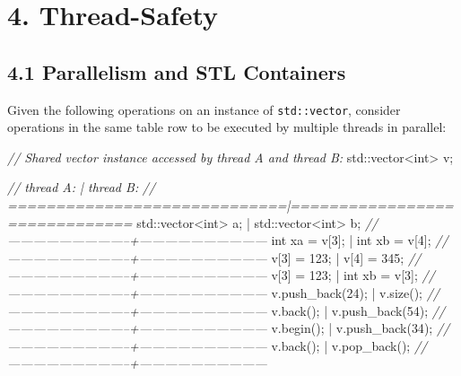 \documentclass[]{article}
\newenvironment{Shaded}{}{}
\newcommand{\DataTypeTok}[1]{\textcolor[rgb]{0.56,0.13,0.00}{{#1}}}
\newcommand{\DecValTok}[1]{\textcolor[rgb]{0.25,0.63,0.44}{{#1}}}
\newcommand{\CommentTok}[1]{\textcolor[rgb]{0.38,0.63,0.69}{\textit{{#1}}}}
\newcommand{\NormalTok}[1]{{#1}}
\begin{document}
\section{4. Thread-Safety}\label{thread-safety}

\subsection{4.1 Parallelism and STL
Containers}\label{parallelism-and-stl-containers}

Given the following operations on an instance of \texttt{std::vector},
consider operations in the same table row to be executed by multiple
threads in parallel:

\begin{Shaded}
\begin{Highlighting}[]
\CommentTok{// Shared vector instance accessed by thread A and thread B:}
\NormalTok{std::vector<}\DataTypeTok{int}\NormalTok{> v;}

\CommentTok{// thread A:                    | thread B:}
\CommentTok{// =============================|==============================}
   \NormalTok{std::vector<}\DataTypeTok{int}\NormalTok{> a;          | std::vector<}\DataTypeTok{int}\NormalTok{> b;}
\CommentTok{// -----------------------------+------------------------------}
   \DataTypeTok{int} \NormalTok{xa = v[}\DecValTok{3}\NormalTok{];               | }\DataTypeTok{int} \NormalTok{xb = v[}\DecValTok{4}\NormalTok{];}
\CommentTok{// -----------------------------+------------------------------}
   \NormalTok{v[}\DecValTok{3}\NormalTok{] = }\DecValTok{123}\NormalTok{;                  | v[}\DecValTok{4}\NormalTok{] = }\DecValTok{345}\NormalTok{;}
\CommentTok{// -----------------------------+------------------------------}
   \NormalTok{v[}\DecValTok{3}\NormalTok{] = }\DecValTok{123}\NormalTok{;                  | }\DataTypeTok{int} \NormalTok{xb = v[}\DecValTok{3}\NormalTok{];}
\CommentTok{// -----------------------------+------------------------------}
   \NormalTok{v.push_back(}\DecValTok{24}\NormalTok{);             | v.size();}
\CommentTok{// -----------------------------+------------------------------}
   \NormalTok{v.back();                    | v.push_back(}\DecValTok{54}\NormalTok{);}
\CommentTok{// -----------------------------+------------------------------}
   \NormalTok{v.begin();                   | v.push_back(}\DecValTok{34}\NormalTok{);}
\CommentTok{// -----------------------------+------------------------------}
   \NormalTok{v.back();                    | v.pop_back();}
\CommentTok{// -----------------------------+------------------------------}
\end{Highlighting}
\end{Shaded}
\end{document}
